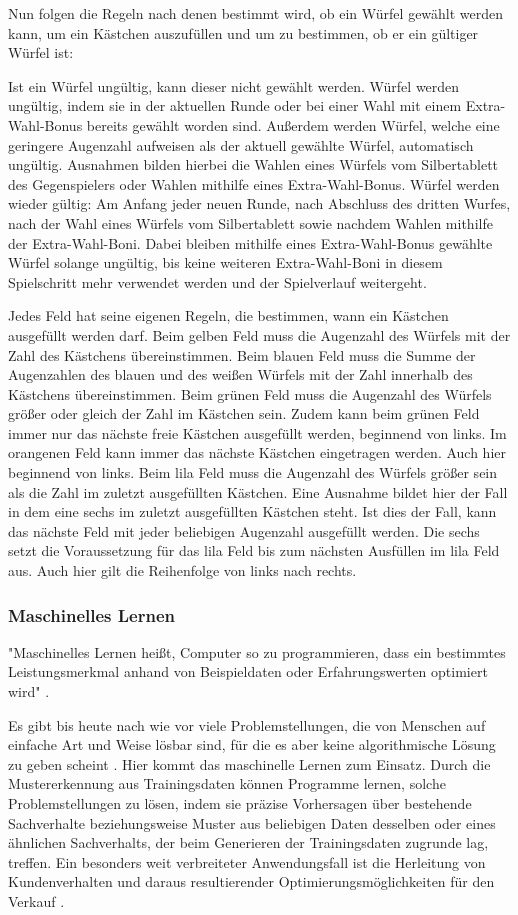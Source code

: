 Nun folgen die Regeln nach denen bestimmt wird, ob ein Würfel gewählt werden kann, um ein Kästchen auszufüllen und um zu bestimmen, ob er ein gültiger Würfel ist:

Ist ein Würfel ungültig, kann dieser nicht gewählt werden. Würfel werden ungültig, indem sie in der aktuellen Runde oder bei einer Wahl mit einem Extra-Wahl-Bonus bereits gewählt worden sind. Außerdem werden Würfel, welche eine geringere Augenzahl aufweisen als der aktuell gewählte Würfel, automatisch ungültig. Ausnahmen bilden hierbei die Wahlen eines Würfels vom Silbertablett des Gegenspielers oder Wahlen mithilfe eines Extra-Wahl-Bonus. Würfel werden wieder gültig: Am Anfang jeder neuen Runde, nach Abschluss des dritten Wurfes, nach der Wahl eines Würfels vom Silbertablett sowie nachdem Wahlen mithilfe der Extra-Wahl-Boni. Dabei bleiben mithilfe eines Extra-Wahl-Bonus gewählte Würfel solange ungültig, bis keine weiteren Extra-Wahl-Boni in diesem Spielschritt mehr verwendet werden und der Spielverlauf weitergeht.

Jedes Feld hat seine eigenen Regeln, die bestimmen, wann ein Kästchen ausgefüllt werden darf. Beim gelben Feld muss die Augenzahl des Würfels mit der Zahl des Kästchens übereinstimmen. Beim blauen Feld muss die Summe der Augenzahlen des blauen und des weißen Würfels mit der Zahl innerhalb des Kästchens übereinstimmen. Beim grünen Feld muss die Augenzahl des Würfels größer oder gleich der Zahl im Kästchen sein. Zudem kann beim grünen Feld immer nur das nächste freie Kästchen ausgefüllt werden, beginnend von links. Im orangenen Feld kann immer das nächste Kästchen eingetragen werden. Auch hier beginnend von links. Beim lila Feld muss die Augenzahl des Würfels größer sein als die Zahl im zuletzt ausgefüllten Kästchen. Eine Ausnahme bildet hier der Fall in dem eine sechs im zuletzt ausgefüllten Kästchen steht. Ist dies der Fall, kann das nächste Feld mit jeder beliebigen Augenzahl ausgefüllt werden. Die sechs setzt die Voraussetzung für das lila Feld bis zum nächsten Ausfüllen im lila Feld aus. Auch hier gilt die Reihenfolge von links nach rechts.
\subsubsection{Maschinelles Lernen}
"Maschinelles Lernen heißt, Computer so zu programmieren, dass ein bestimmtes Leistungsmerkmal anhand von Beispieldaten oder Erfahrungswerten optimiert wird" \cite[Seite 3]{alpaydin_maschinelles_2022}.

Es gibt bis heute nach wie vor viele Problemstellungen, die von Menschen auf einfache Art und Weise lösbar sind, für die es aber keine algorithmische Lösung zu geben scheint \cite[Seite 1]{alpaydin_maschinelles_2022}. Hier kommt das maschinelle Lernen zum Einsatz. Durch die Mustererkennung aus Trainingsdaten können Programme lernen, solche Problemstellungen zu lösen, indem sie präzise Vorhersagen über bestehende Sachverhalte beziehungsweise Muster aus beliebigen Daten desselben oder eines ähnlichen Sachverhalts, der beim Generieren der Trainingsdaten zugrunde lag, treffen. Ein besonders weit verbreiteter Anwendungsfall ist die Herleitung von Kundenverhalten und daraus resultierender Optimierungsmöglichkeiten für den Verkauf \cite[Seite 1f]{alpaydin_maschinelles_2022}. 

